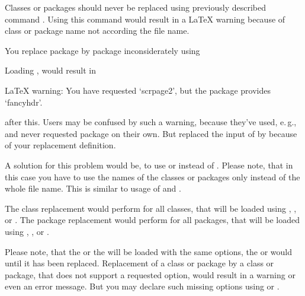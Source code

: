 \begin{Declaration}
\end{Declaration}%
Classes or packages
should never be replaced using previously described command
. Using this command would result in a \LaTeX{} warning
because of class or package name not according the file name.
\begin{Example}
  You replace package  by package 
  inconsiderately using
\begin{lstcode}
\end{lstcode}
  Loading , would result in
\begin{lstcode}
  LaTeX warning: You have requested `scrpage2',
                 but the package provides `fancyhdr'.
\end{lstcode}
  after this. Users may be confused by such a warning, because they've used,
  e.\,g.,  and never requested package
   on their own. But  replaced the input
  of  by  because of your replacement
  definition.
\end{Example}
A solution for this problem would be, to use  or
 instead of . Please note, that in
this case you have to use the names of the classes or packages only instead of
the whole file name. This is similar to usage of  and
.

The class replacement would perform for all classes, that will be loaded using
, , or . The
package replacement would perform for all packages, that will be loaded using
, , or
.

Please note, that the  or the
 will be loaded with the same options, the
 or  would until it has been
replaced. Replacement of a class or package by a class or package, that
does not support a requested option, would result in a warning or even an error
message. But you may declare such missing options using  or
.

